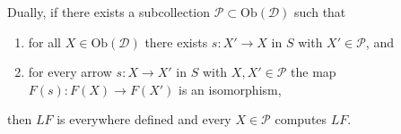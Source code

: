 \begin{proposition}
    Dually, if there exists a subcollection $\mathcal{P} \subset \text{Ob}(\mathcal{D})$ such that
    \begin{enumerate}
        \item for all $X \in \text{Ob}(\mathcal{D})$ there exists $s : X' \to X$ in $S$ with $X' \in \mathcal{P}$, and
        \item for every arrow $s : X \to X'$ in $S$ with $X, X' \in \mathcal{P}$ the map $F(s) : F(X) \to F(X')$ is an isomorphism,
    \end{enumerate}
    then $LF$ is everywhere defined and every $X \in \mathcal{P}$ computes $LF$.
\end{proposition}